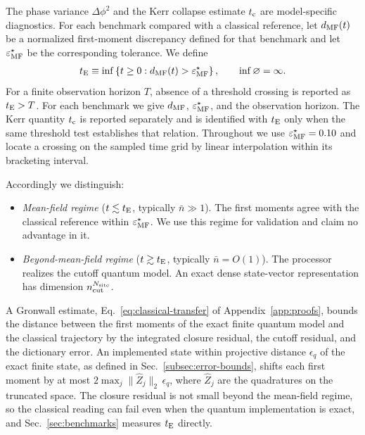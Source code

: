 \documentclass[pra,twocolumn,superscriptaddress,nofootinbib,floatfix]{revtex4-2}
\theoremstyle{remark}
\newcommand{\revcolor}{\color{blue}}
\DeclareRobustCommand{\rev}[1]{{\revcolor #1}}
\begin{document}
The phase variance \(\Delta\phi^2\) and the Kerr collapse estimate \(t_{\rm c}\) are model-specific diagnostics. \rev{For each benchmark compared with a classical reference, let \(d_{\rm MF}(t)\) be a normalized first-moment discrepancy defined for that benchmark and let \(\varepsilon_{\rm MF}^{\star}\) be the corresponding tolerance.} We define
\begin{align}
t_{\rm E} \equiv \inf\left\{ t\geq0: d_{\rm MF}(t)>\varepsilon_{\rm MF}^{\star} \right\}, \qquad \inf\varnothing=\infty .
\label{eq:mean-field-validity-time}
\end{align}
\rev{For a finite observation horizon \(T\), absence of a threshold crossing is reported as \(t_{\rm E}>T\).} \rev{For each benchmark we give \(d_{\rm MF}\), \(\varepsilon_{\rm MF}^{\star}\), and the observation horizon.} The Kerr quantity \(t_{\rm c}\) is reported separately and is identified with \(t_{\rm E}\) only when the same threshold test establishes that relation. \rev{Throughout we use \(\varepsilon_{\rm MF}^{\star}=0.10\) and locate a crossing on the sampled time grid by linear interpolation within its bracketing interval.}

Accordingly we distinguish:
\begin{itemize}
\item \rev{\emph{Mean-field regime} (\(t\lesssim t_{\rm E}\), typically \(\bar n\gg1\)).} \rev{The first moments agree with the classical reference within \(\varepsilon_{\rm MF}^{\star}\).} We use this regime for validation and claim no advantage in it.
\item \rev{\emph{Beyond-mean-field regime} (\(t\gtrsim t_{\rm E}\), typically \(\bar n=O(1)\)).} The processor realizes the cutoff quantum model. An exact dense state-vector representation has dimension \(n_{\rm cut}^{N_{\rm site}}\).
\end{itemize}

\rev{A Gronwall estimate, Eq.~\eqref{eq:classical-transfer} of Appendix~\ref{app:proofs}, bounds the distance between the first moments of the exact finite quantum model and the classical trajectory by the integrated closure residual, the cutoff residual, and the dictionary error.} \rev{An implemented state within projective distance \(\epsilon_q\) of the exact finite state, as defined in Sec.~\ref{subsec:error-bounds}, shifts each first moment by at most \(2\max_j\|\hat Z_j\|_2\,\epsilon_q\), where \(\hat Z_j\) are the quadratures on the truncated space.} \rev{The closure residual is not small beyond the mean-field regime, so the classical reading can fail even when the quantum implementation is exact, and Sec.~\ref{sec:benchmarks} measures \(t_{\rm E}\) directly.}
\end{document}

